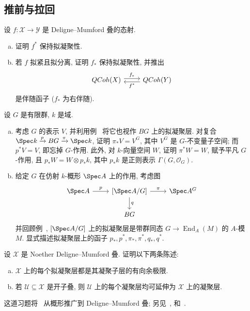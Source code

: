 \subsection{推前与拉回}\label{src:5.1.4-subsection}
\begin{exercise}[推前--拉回伴随]\label{src:5.1.26}
设 $f:\mathcal X\to\mathcal Y$ 是 Deligne--Mumford 叠的态射.
\begin{enumerate}[(a)]
\item 证明 $f^*$ 保持拟凝聚性.
\item 若 $f$ 拟紧且拟分离, 证明 $f_*$ 保持拟凝聚性, 并推出
\[
\begin{tikzcd}
\QCoh(\mathcal X)\arrow[r,shift left,"f_*"]&\QCoh(\mathcal Y)\arrow[l,shift left,"f^*"]
\end{tikzcd}
\]
是伴随函子 ($f_*$ 为右伴随).
\end{enumerate}
\end{exercise}
\begin{exercise}[有益的练习]\label{src:5.1.27}
设 $G$ 是有限群, $k$ 是域.
\begin{enumerate}[(a)]
\item 考虑 $G$ 的表示 $V$, 并利用例~ 将它也视作 $BG$ 上的拟凝聚层. 对复合 $\Spec k\xrightarrow{p}BG\xrightarrow{\pi}\Spec k$, 证明 $\pi_*V=V^G$, 其中 $V^G$ 是 $G$-不变量子空间; 而 $p^*V=V$, 即忘掉 $G$-作用. 此外, 对 $k$-向量空间 $W$, 证明 $\pi^*W=W$, 赋予平凡 $G$-作用, 且 $p_*W=W\otimes p_*k$, 其中 $p_*k$ 是正则表示 $\Gamma(G,\mathcal O_G)$.
\item 给定 $G$ 在仿射 $k$-概形 $\Spec A$ 上的作用, 考虑图
\[
\begin{tikzcd}
\Spec A\arrow[r,"p"]&{[\Spec A/G]}\arrow[r,"\pi"]\arrow[d,"q"]&\Spec A^G\\
&BG&
\end{tikzcd}
\]
并回顾例~, $[\Spec A/G]$ 上的拟凝聚层是带群同态 $G\to\operatorname{End}_A(M)$ 的 $A$-模 $M$. 显式描述拟凝聚层上的函子 $p_*,p^*,\pi_*,\pi^*,q_*,q^*$.
\end{enumerate}
\end{exercise}
\begin{exercise}[困难]\label{src:5.1.28}
设 $\mathcal X$ 是 Noether Deligne--Mumford 叠. 证明以下两条陈述:
\begin{enumerate}[(a)]
\item $\mathcal X$ 上的每个拟凝聚层都是其凝聚子层的有向余极限.
\item 若 $\mathcal U\subseteq\mathcal X$ 是开子叠, 则 $\mathcal U$ 上的每个凝聚层均可延伸为 $\mathcal X$ 上的凝聚层.
\end{enumerate}
\end{exercise}
这道习题将~\cite[习题 II.5.15]{Har77} 从概形推广到 Deligne--Mumford 叠; 另见~\cite[命题 15.4]{LMB00}, \cite[命题 7.1.11]{Ols16} 和~\cite[Tag 0GRE]{SP}.

